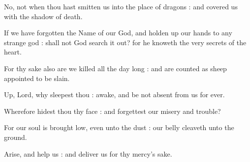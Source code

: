 No, not when thou hast smitten us into the place of dragons : and covered us with the shadow of death.\par
{}If we have forgotten the Name of our God, and holden up our hands to any strange god : shall not God search it out? for he knoweth the very secrets of the heart.\par
{}For thy sake also are we killed all the day long : and are counted as sheep appointed to be slain.\par
{}Up, Lord, why sleepest thou : awake, and be not absent from us for ever.\par
{}Wherefore hidest thou thy face : and forgettest our misery and trouble?\par
{}For our soul is brought low, even unto the dust : our belly cleaveth unto the ground.\par
{}Arise, and help us : and deliver us for thy mercy's sake.\par


